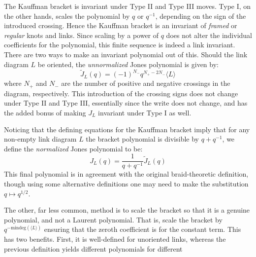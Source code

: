         \par\hfill\par
        The Kauffman bracket is invariant under Type II and Type III moves.
        Type I, on the other hands, scales the polynomial by $q$ or $q^{-1}$,
        depending on the sign of the introduced crossing. Hence the Kauffman
        bracket is an invariant of \textit{framed} or \textit{regular} knots
        and links. Since scaling by a power of $q$ does not alter the individual
        coefficients for the polynomial, this finite sequence is indeed a link
        invariant. There are two ways to make an invariant polynomial out of
        this. Should the link diagram $L$ be oriented, the
        \textit{unnormalized} Jones polynomial is given by:
        \begin{equation}
            \label{eqn:unnormalized_jones}
            \tilde{J}_{L}(q)=(-1)^{N_{-}}q^{N_{+}-2N_{-}}\langle{L}\rangle
        \end{equation}
        where $N_{+}$ and $N_{-}$ are the number of positive and negative
        crossings in the diagram, respectively. This introduction of the
        crossing signs does not change under Type II and Type III, essentially
        since the write does not change, and has the added bonus of making
        $J_{L}$ invariant under Type I as well.
        \par\hfill\par
        Noticing that the defining
        equations for the Kauffman bracket imply that for any non-empty link
        diagram $L$ the bracket polynomial is divisible by $q+q^{-1}$, we
        define the \textit{normalized} Jones polynomial to be:
        \begin{equation}
            J_{L}(q)=\frac{1}{q+q^{-1}}\tilde{J}_{L}(q)
        \end{equation}
        This final polynomial is in agreement with the original braid-theoretic
        definition, though using some alternative definitions one may need to
        make the substitution $q\mapsto{q}^{1/2}$.
        \par\hfill\par
        The other, far less common, method is to scale the bracket so that
        it is a genuine polynomial, and not a Laurent polynomial. That is,
        scale the bracket by $q^{-\textrm{mindeg}(\langle{L}\rangle)}$
        ensuring that the zeroth coefficient is for the constant term. This has
        two benefits. First, it is well-defined for unoriented links, whereas
        the previous definition yields different polynomials for different
